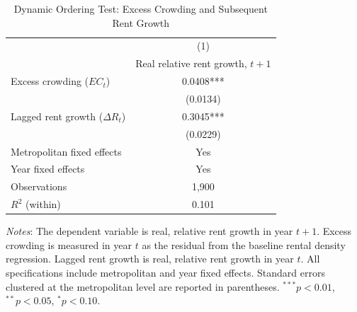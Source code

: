 \begin{table}[!htbp]
\centering
\caption{Dynamic Ordering Test: Excess Crowding and Subsequent Rent Growth}
\label{tab:granger_rent}
\begin{tabular}{l c}
\hline\hline
 & (1) \\
 & Real relative rent growth, $t+1$ \\
\hline
Excess crowding ($EC_t$) & 0.0408*** \\
                         & (0.0134) \\
Lagged rent growth ($\Delta R_t$) & 0.3045*** \\
                                 & (0.0229) \\
\hline
Metropolitan fixed effects & Yes \\
Year fixed effects         & Yes \\
Observations               & 1,900 \\
$R^{2}$ (within)           & 0.101 \\
\hline\hline
\end{tabular}

\begin{flushleft}
\footnotesize
\textit{Notes}: The dependent variable is real, relative rent growth in year $t+1$.
Excess crowding is measured in year $t$ as the residual from the baseline rental density
regression. Lagged rent growth is real, relative rent growth in year $t$. All
specifications include metropolitan and year fixed effects. Standard errors clustered
at the metropolitan level are reported in parentheses.
$^{***}p<0.01$, $^{**}p<0.05$, $^{*}p<0.10$.
\end{flushleft}
\end{table}
